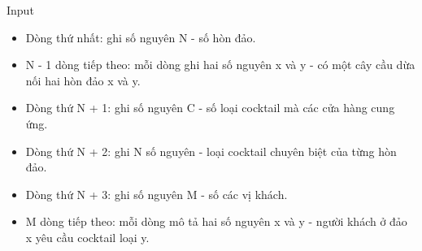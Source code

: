 Input  
\begin{itemize}
	\item     Dòng thứ nhất: ghi số nguyên N - số hòn đảo.   
	\item     N - 1 dòng tiếp theo: mỗi dòng ghi hai số nguyên x và y - có một cây cầu dừa nối hai hòn đảo x và y.   
	\item     Dòng thứ N + 1: ghi số nguyên C - số loại cocktail mà các cửa hàng cung ứng.   
	\item     Dòng thứ N + 2: ghi N số nguyên - loại cocktail chuyên biệt của từng hòn đảo.   
	\item     Dòng thứ N + 3: ghi số nguyên M - số các vị khách.   
	\item     M dòng tiếp theo: mỗi dòng mô tả hai số nguyên x và y - người khách ở đảo x yêu cầu cocktail loại y.   
\end{itemize}